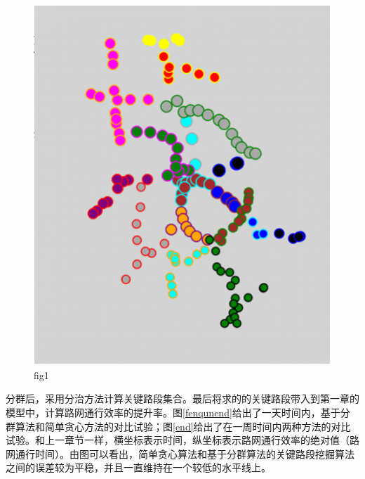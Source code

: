 				\begin{figure}
				\centering
				\includegraphics[width=4.4in]{picture/fenqunjieguo}
				\caption{fig1}
				\label{fenqun3}
				\end{figure}

		分群后，采用分治方法计算关键路段集合。最后将求的的关键路段带入到第一章的模型中，计算路网通行效率的提升率。图\ref{fenqunend}给出了一天时间内，基于分群算法和简单贪心方法的对比试验；图\ref{end}给出了在一周时间内两种方法的对比试验。和上一章节一样，横坐标表示时间，纵坐标表示路网通行效率的绝对值（路网通行时间）。由图可以看出，简单贪心算法和基于分群算法的关键路段挖掘算法之间的误差较为平稳，并且一直维持在一个较低的水平线上。


